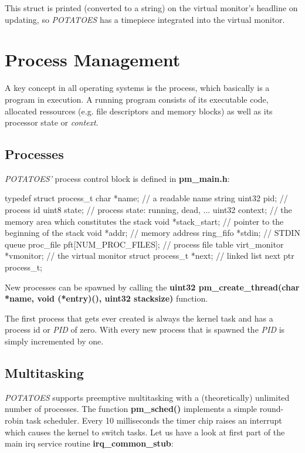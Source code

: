 \documentclass[11pt,a4paper]{scrartcl}
\begin{document}
This struct is printed (converted to a string) on the virtual monitor's headline on updating, so \textit{POTATOES} has a timepiece integrated into the virtual monitor.
\pagebreak

\section{Process Management}
A key concept in all operating systems is the process, which basically is a program in execution. A running program consists of its executable code, allocated ressources (e.g. file descriptors and memory blocks) as well as its processor state or \textit{context}. 

\subsection{Processes}
\textit{\textit{POTATOES}'} process control block is defined in \textbf{pm\_main.h}:

\begin{code}
typedef struct process_t {	
	char *name; // a readable name string
	uint32 pid; // process id
	uint8 state; // process state: running, dead, ...
	uint32 context; // the memory area which constitutes the stack
	void *stack_start; // pointer to the beginning of the stack
	void *addr; // memory address
	ring_fifo *stdin; // STDIN queue
	proc_file pft[NUM_PROC_FILES]; // process file table
	virt_monitor *vmonitor; // the virtual monitor
	struct process_t *next; // linked list next ptr
} process_t;
\end{code}

New processes can be spawned by calling the \textbf{uint32 pm\_create\_thread(char *name, void (*entry)(), uint32 stacksize)} function.

The first process that gets ever created is always the kernel task and has a process id or \textit{PID} of zero. With every new process that is spawned the \textit{PID} is simply incremented by one. 

\hypertarget{SCHEDULER}{}
\subsection{Multitasking}
\textit{POTATOES} supports preemptive multitasking with a (theoretically) unlimited number of processes. The function \textbf{pm\_sched()} implements a simple round-robin task scheduler.
Every 10 milliseconds the timer chip raises an interrupt which causes the kernel to switch tasks. Let us have a look at first part of the main irq service routine \textbf{irq\_common\_stub}:
\end{document}
